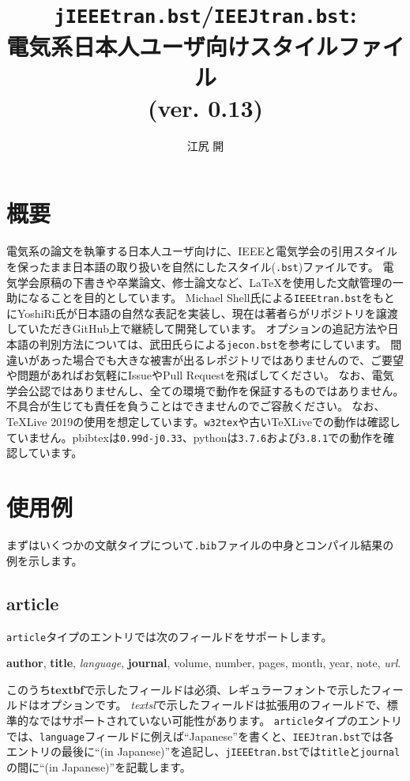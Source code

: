 \documentclass[10pt, a4paper]{jsarticle}
\title{\texttt{jIEEEtran.bst}/\texttt{IEEJtran.bst}:\\電気系日本人ユーザ向け\BibTeX スタイルファイル\\(ver. 0.13)}
\author{江尻 開}
\begin{document}
\maketitle
\tableofcontents



\section{概要}
\begin{bibunit}[jIEEEtran]

電気系の論文を執筆する日本人ユーザ向けに、IEEEと電気学会の引用スタイルを保ったまま日本語の取り扱いを自然にした\BibTeX スタイル(\texttt{.bst})ファイルです。
電気学会原稿の下書きや卒業論文、修士論文など、\LaTeX を使用した文献管理の一助になることを目的としています。
Michael Shell氏による\texttt{IEEEtran.bst}\cite{IEEEtran}をもとにYoshiRi氏が日本語の自然な表記を実装し、現在は著者らがリポジトリを譲渡していただきGitHub上\cite{jIEEEtran}で継続して開発しています。
オプションの追記方法や日本語の判別方法については、武田氏らによる\texttt{jecon.bst}\cite{jeconbst}を参考にしています。
間違いがあった場合でも大きな被害が出るレポジトリではありませんので、ご要望や問題があればお気軽にIssueやPull Requestを飛ばしてください。
なお、電気学会公認ではありませんし、全ての環境で動作を保証するものではありません。不具合が生じても責任を負うことはできませんのでご容赦ください。
なお、\TeX Live 2019の使用を想定しています。\texttt{w32tex}や古い\TeX Liveでの動作は確認していません。pbibtexは\texttt{0.99d-j0.33}、pythonは\texttt{3.7.6}および\texttt{3.8.1}での動作を確認しています。

{\small \putbib[./ref]}
\end{bibunit}


\section{使用例}
まずはいくつかの文献タイプについて\texttt{.bib}ファイルの中身とコンパイル結果の例を示します。

\subsection{article}

\texttt{article}タイプのエントリでは次のフィールドをサポートします。
\begin{center}
\textbf{author}, \textbf{title}, \textsl{language}, \textbf{journal}, volume, number, pages, month, year, note, \textsl{url}.
\end{center}
このうち\textbf{textbf}で示したフィールドは必須、レギュラーフォントで示したフィールドはオプションです。
\textsl{textsl}で示したフィールドは拡張用のフィールドで、標準的な\BibTeX ではサポートされていない可能性があります。
\texttt{article}タイプのエントリでは、\texttt{language}フィールドに例えば``Japanese''を書くと、\texttt{IEEJtran.bst}では各エントリの最後に``(in Japanese)''を追記し、\texttt{jIEEEtran.bst}では\texttt{title}と\texttt{journal}の間に``(in Japanese)''を記載します。
\end{document}
